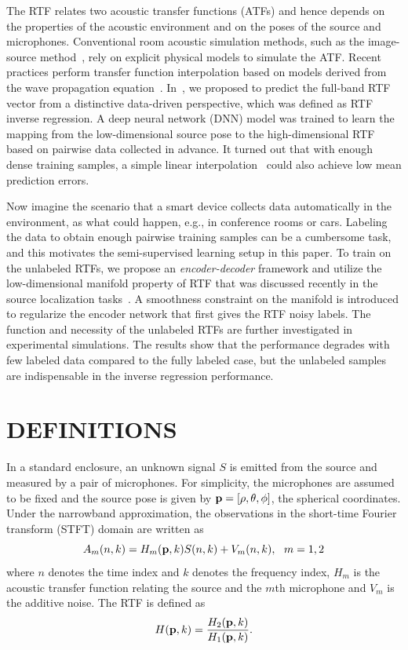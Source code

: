 \documentclass{article}
\begin{document}
The RTF relates two acoustic transfer functions (ATFs) and hence depends on the properties of the acoustic environment and on the poses of the source and microphones. Conventional room acoustic simulation methods, such as the image-source method~\cite{allen1979image}, rely on explicit physical models to simulate the ATF. Recent practices perform transfer function interpolation based on models derived from the wave propagation equation~\cite{samarasinghe2015efficient,mignot2014low}. In~\cite{rtfinv2017}, we proposed to predict the full-band RTF vector from a distinctive data-driven perspective, which was defined as RTF inverse regression. A deep neural network (DNN) model was trained to learn the mapping from the low-dimensional source pose to the high-dimensional RTF based on pairwise data collected in advance. It turned out that with enough dense training samples, a simple linear interpolation~\cite{vincent2013second} could also achieve low mean prediction errors.

Now imagine the scenario that a smart device collects data automatically in the environment, as what could happen, e.g., in conference rooms or cars. Labeling the data to obtain enough pairwise training samples can be a cumbersome task, and this motivates the semi-supervised learning setup in this paper. To train on the unlabeled RTFs, we propose an \emph{encoder-decoder} framework and utilize the low-dimensional manifold property of RTF that was discussed recently in the source localization tasks~\cite{deleforge20122d,laufer2013relative,deleforge2015acoustic,laufer2016mr}. A smoothness constraint on the manifold is introduced to regularize the encoder network that first gives the RTF noisy labels. The function and necessity of the unlabeled RTFs are further investigated in experimental simulations. The results show that the performance degrades with few labeled data compared to the fully labeled case, but the unlabeled samples are indispensable in the inverse regression performance.

\section{DEFINITIONS}
\label{sec:defs}

In a standard enclosure, an unknown signal $S$ is emitted from the source and measured by a pair of microphones. For simplicity, the microphones are assumed to be fixed and the source pose is given by ${\bf p}=[\rho,\theta,\phi]$, the spherical coordinates. Under the narrowband approximation, the observations in the short-time Fourier transform (STFT) domain are written as
\begin{equation}\label{eq:sigfreq}
  A_m(n,k) = H_m({\bf p},k)S(n,k) + V_m(n,k), ~~m=1,2
\end{equation}
where $n$ denotes the time index and $k$ denotes the frequency index, $H_m$ is the acoustic transfer function relating the source and the $m$th microphone and $V_m$ is the additive noise. The RTF is defined as
\begin{equation}\label{eq:rtf}
  H({\bf p}, k) = \frac{H_2({\bf p}, k)}{H_1({\bf p}, k)}.
\end{equation}
\end{document}
